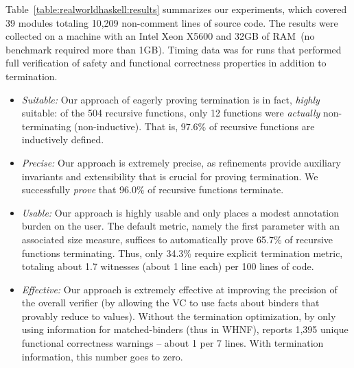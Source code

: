 

Table~\ref{table:realworldhaskell:results} summarizes our experiments, which 
covered 39 modules totaling 10,209 non-comment lines of 
source code. %
%
The results were collected on a machine with an Intel Xeon 
X5600 and 32GB of RAM~(no benchmark required more than 1GB).
%
Timing data was for runs that performed full
verification of safety and functional correctness 
properties in addition to termination. %

\begin{itemize}
  \item{\emph{Suitable:}} Our approach of eagerly proving termination is in
    fact, \emph{highly} suitable: of the %
    504 recursive functions, only 12 functions were \emph{actually}
    non-terminating (\ie non-inductive).
    That is, 97.6\% of recursive functions 
    are inductively defined.

  \item{\emph{Precise:}} Our approach is extremely precise, as refinements
    provide auxiliary invariants and extensibility that is crucial for 
    proving termination. We successfully \emph{prove} that 96.0\% of 
    recursive functions %
    terminate. 

  \item{\emph{Usable:}} Our approach is highly usable and only places a 
    modest annotation burden on the user. The default metric, namely the first 
    parameter with an associated size measure, suffices to automatically 
    prove 65.7\% of recursive functions terminating. Thus, only 34.3\% require 
    explicit termination metric, totaling about 1.7 witnesses (about 1 line
    each) per 100 lines of code.

  \item{\emph{Effective:}} Our approach is extremely effective at improving the
    precision of the overall verifier (by allowing the VC to use facts
    about binders that provably reduce to values).
    Without the termination optimization, \ie by only using information 
    for matched-binders (thus in WHNF), \toolname reports 1,395 
    unique functional correctness warnings -- about 1 per 7 lines.
    With termination information, this number goes to zero.
\end{itemize}



